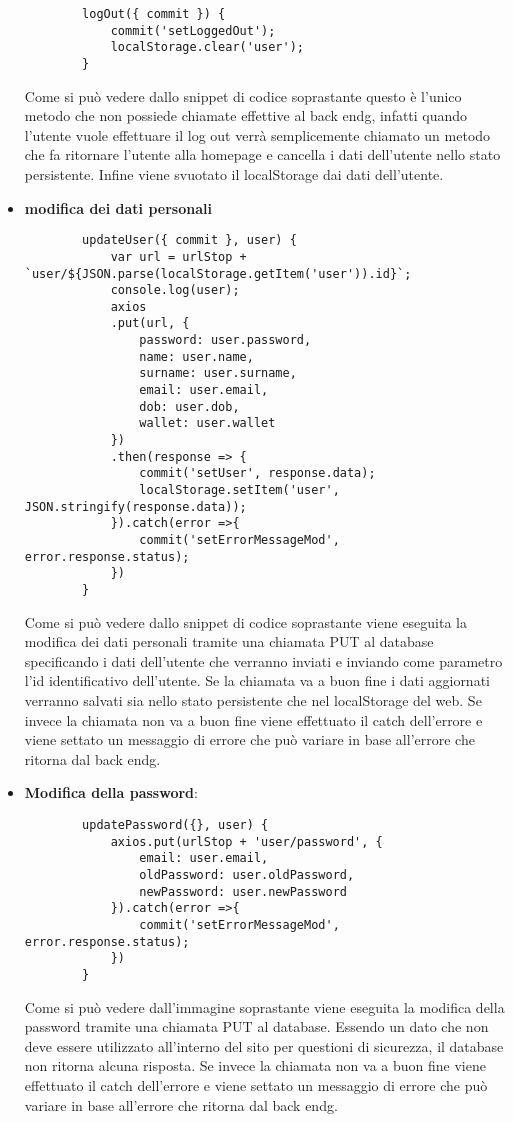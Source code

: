 \begin{itemize}
	\begin{lstlisting}
		logOut({ commit }) {
			commit('setLoggedOut');
			localStorage.clear('user');
		}
	\end{lstlisting}
	Come si può vedere dallo snippet di codice soprastante questo è l'unico metodo che non possiede chiamate effettive al \gls{back endg}, infatti quando l'utente vuole effettuare il log out verrà semplicemente chiamato un metodo che fa ritornare l'utente alla homepage e cancella i dati dell'utente nello stato persistente. Infine viene svuotato il localStorage dai dati dell'utente.
	\item \textbf{modifica dei dati personali}
	\begin{lstlisting}
		updateUser({ commit }, user) {
			var url = urlStop + `user/${JSON.parse(localStorage.getItem('user')).id}`;
			console.log(user);
			axios
			.put(url, {
				password: user.password,
				name: user.name,
				surname: user.surname,
				email: user.email,
				dob: user.dob,
				wallet: user.wallet
			})
			.then(response => {
				commit('setUser', response.data);
				localStorage.setItem('user', JSON.stringify(response.data));
			}).catch(error =>{
				commit('setErrorMessageMod', error.response.status);
			})
		}
	\end{lstlisting}
	Come si può vedere dallo snippet di codice soprastante viene eseguita la modifica dei dati personali tramite una chiamata PUT al database specificando i dati dell'utente che verranno inviati e inviando come parametro l'id identificativo dell'utente. Se la chiamata va a buon fine i dati aggiornati verranno salvati sia nello stato persistente che nel localStorage del web. Se invece  la chiamata non va a buon fine viene effettuato il catch dell'errore e viene settato un messaggio di errore che può variare in base all'errore che ritorna dal \gls{back endg}.
	\item \textbf{Modifica della password}:
	\begin{lstlisting}
		updatePassword({}, user) {
			axios.put(urlStop + 'user/password', {
				email: user.email,
				oldPassword: user.oldPassword,
				newPassword: user.newPassword
			}).catch(error =>{
				commit('setErrorMessageMod', error.response.status);
			})
		}
	\end{lstlisting}
	Come si può vedere dall'immagine soprastante viene eseguita la modifica della password tramite una chiamata PUT al database. Essendo un dato che non deve essere utilizzato all'interno del sito per questioni di sicurezza, il database non ritorna alcuna risposta. Se invece  la chiamata non va a buon fine viene effettuato il catch dell'errore e viene settato un messaggio di errore che può variare in base all'errore che ritorna dal \gls{back endg}.
\end{itemize}

